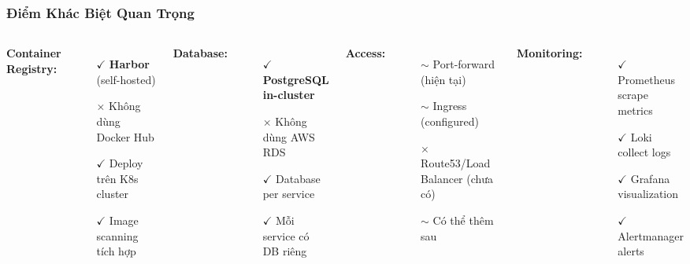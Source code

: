 \documentclass[aspectratio=169]{beamer}
\begin{document}
\begin{frame}
\frametitle{Điểm Khác Biệt Quan Trọng}
\begin{columns}
\textbf{Container Registry:}
\begin{itemize}
    \item[$\checkmark$] \textbf{Harbor} (self-hosted)
    \item[$\times$] Không dùng Docker Hub
    \item[$\checkmark$] Deploy trên K8s cluster
    \item[$\checkmark$] Image scanning tích hợp
\end{itemize}

\vspace{0.3cm}
\textbf{Database:}
\begin{itemize}
    \item[$\checkmark$] \textbf{PostgreSQL in-cluster}
    \item[$\times$] Không dùng AWS RDS
    \item[$\checkmark$] Database per service
    \item[$\checkmark$] Mỗi service có DB riêng
\end{itemize}

\textbf{Access:}
\begin{itemize}
    \item[$\sim$] Port-forward (hiện tại)
    \item[$\sim$] Ingress (configured)
    \item[$\times$] Route53/Load Balancer (chưa có)
    \item[$\sim$] Có thể thêm sau
\end{itemize}

\vspace{0.3cm}
\textbf{Monitoring:}
\begin{itemize}
    \item[$\checkmark$] Prometheus scrape metrics
    \item[$\checkmark$] Loki collect logs
    \item[$\checkmark$] Grafana visualization
    \item[$\checkmark$] Alertmanager alerts
\end{itemize}
\end{columns}
\end{frame}

\end{document}
